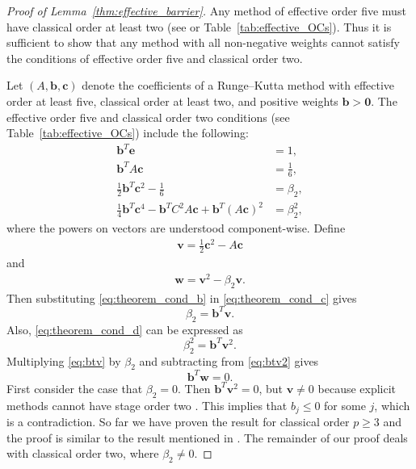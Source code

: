 \begin{proof}[Proof of Lemma~\ref{thm:effective_barrier}]
	Any method of effective order five must have classical order at least two
	(see \cite{Butcher2008_book} or Table~\ref{tab:effective_OCs}).
    Thus it is sufficient to show that any method with all non-negative weights
    cannot satisfy the conditions of effective order five and classical order two.

    Let $(A,\bm{b},\bm{c})$ denote the coefficients of a Runge--Kutta method with
    effective order at least five, classical order at least two, and positive 
    weights $\bm{b} > \bm{0}$.
    The effective order five and classical order two conditions
    (see Table~\ref{tab:effective_OCs}) include the following:
    \begin{subequations}\label{eq:theorem_cond}
    		\begin{align}
    			\bm{b}^T\bm{e} & = 1, \label{eq:theorem_cond_a} \\
             	\bm{b}^TA\bm{c} &= \frac{1}{6}, \label{eq:theorem_cond_b} \\
            	\frac{1}{2}\bm{b}^T\bm{c}^2 - \frac{1}{6} &= \beta_2, \label{eq:theorem_cond_c} \\
            	\frac{1}{4}\bm{b}^T\bm{c}^4 - \bm{b}^TC^2A\bm{c} + \bm{b}^T(A\bm{c})^2 &= \beta_2^2, \label{eq:theorem_cond_d}
        	\end{align}
	\end{subequations}
	where the powers on vectors are understood component-wise. 
	Define
	\begin{align*} 
		\bm{v} = \frac{1}{2}\bm{c}^2 - A\bm{c}
	\end{align*}
	and
	\begin{align}\label{eq:def_w}
		\bm{w} = \bm{v}^{2} - \beta_{2}\bm{v}.
	\end{align}
	Then substituting \eqref{eq:theorem_cond_b} in \eqref{eq:theorem_cond_c} gives
	\begin{equation}\label{eq:btv}
		\beta_2 = \bm{b}^T\bm{v}.
	\end{equation}
	Also, \eqref{eq:theorem_cond_d} can be expressed as
	\begin{equation}\label{eq:btv2}
		\beta_2^2 = \bm{b}^T\bm{v}^2.
	\end{equation}
        Multiplying \eqref{eq:btv} by $\beta_2$ and subtracting
        from \eqref{eq:btv2} gives
	\begin{equation}\label{eq:btw}
		\bm{b}^T\bm{w} = 0.
	\end{equation}
	First consider the case that $\beta_2 = 0$. 
	Then $\bm{b}^T\bm{v}^2 = 0$, but $\bm{v }\neq 0$ because explicit methods
	cannot have stage order two \cite{Ruuth2002}. This implies that $b_j \leq 0$ 
	for some $j$, which is a contradiction.
	So far we have proven the result for classical order $p \ge 3$ 
	and the proof is similar to the result mentioned in \cite{Ruuth2002}. 
	The remainder of our proof deals with classical order two, 
	where $\beta_2 \neq 0$.


\end{proof}
